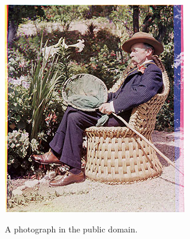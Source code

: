 \begin{figure}[h]
	\centering\label{fig:photo}
	\includegraphics{../graphics/Acland1903.png}
	\caption[A public-domain photograph]{A photograph in the public domain.}
\end{figure}

\lipsum[53-56]
